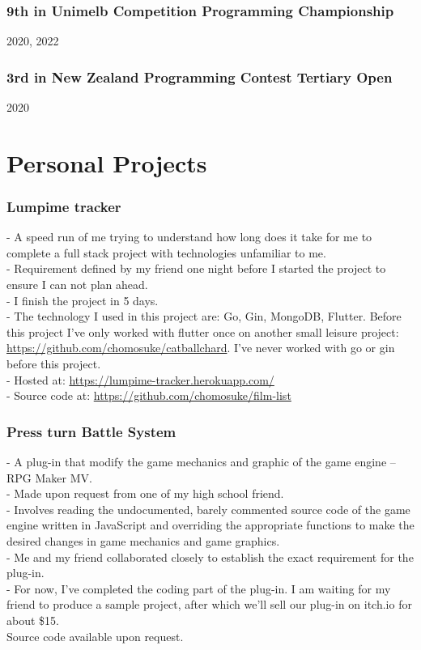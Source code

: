 \documentclass[9pt]{extarticle}
\begin{document}
\subsubsection*{9th in Unimelb Competition Programming Championship}
2020, 2022

\subsubsection*{3rd in New Zealand Programming Contest Tertiary Open}
2020

\section*{Personal Projects}
\subsubsection*{Lumpime tracker}
- A speed run of me trying to understand how long does it take for me to complete a full stack project with technologies unfamiliar to me.\\
- Requirement defined by my friend one night before I started the project to ensure I can not plan ahead.\\
- I finish the project in 5 days.\\
- The technology I used in this project are: Go, Gin, MongoDB, Flutter. Before this project I’ve only worked with flutter once on another small leisure project: \url{https://github.com/chomosuke/catballchard}. I’ve never worked with go or gin before this project.\\
- Hosted at: \url{https://lumpime-tracker.herokuapp.com/}\\
- Source code at: \url{https://github.com/chomosuke/film-list}

\subsubsection*{Press turn Battle System}
- A plug-in that modify the game mechanics and graphic of the game engine – RPG Maker MV.\\
- Made upon request from one of my high school friend.\\
- Involves reading the undocumented, barely commented source code of the game engine written in JavaScript and overriding the appropriate functions to make the desired changes in game mechanics and game graphics.\\
- Me and my friend collaborated closely to establish the exact requirement for the plug-in.\\
- For now, I’ve completed the coding part of the plug-in. I am waiting for my friend to produce a sample project, after which we’ll sell our plug-in on itch.io for about \$15.\\
Source code available upon request.
\end{document}
